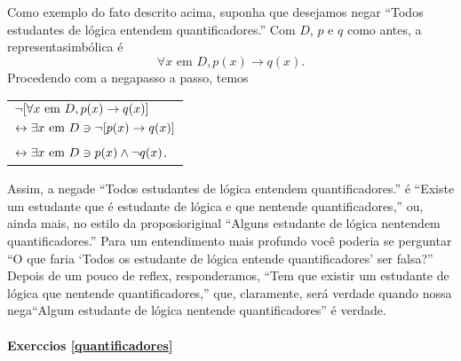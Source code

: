 Como exemplo do fato descrito acima, suponha que desejamos negar ``Todos estudantes de l\'ogica entendem quantificadores.'' Com $D$, $p$ e $q$ como antes, a representa\cao simb\'olica \'e
\[
\forall x \textrm{ em } D, p(x)\to q(x).
\]
Procedendo com a nega\cao passo a passo, temos

\begin{tabular}{l}
$\lnot[\forall x \textrm{ em } D, p(x)\to q(x)]$ \\
$\leftrightarrow \exists x \textrm{ em } D \ni \lnot[p(x)\to q(x)]$  \\
$\leftrightarrow \exists x \textrm{ em } D \ni p(x) \wedge\lnot q(x)$.
\end{tabular}

Assim, a nega\cao de ``Todos estudantes de l\'ogica entendem quantificadores.'' \'e ``Existe um estudante que \'e estudante de l\'ogica e que n\ao entende quantificadores,'' ou, ainda mais, no estilo da proposi\cao original ``Alguns estudante de l\'ogica n\ao entendem quantificadores.'' Para um entendimento mais profundo voc\^e poderia se perguntar ``O que faria `Todos os estudante de l\'ogica entende quantificadores' ser falsa?'' Depois de um pouco de reflex\aoi, responder\ih amos, ``Tem que existir um estudante de l\'ogica que n\ao entende quantificadores,'' que, claramente, ser\'a verdade quando nossa nega\cao ``Algum estudante de l\'ogica n\ao entende quantificadores'' \'e verdade.

\paragraph{Exerc\ih cios \ref{quantificadores}}

